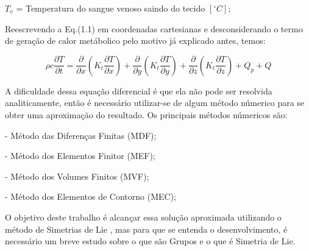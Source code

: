       $T_{v}$ = Temperatura do sangue venoso saindo do tecido $[^{\circ}C];$










  Reescrevendo a Eq.(1.1) em coordenadas cartesianas e desconsiderando o termo de geração de calor metábolico pelo motivo já explicado antes, temos:



  \begin{equation}\rho c\frac{\partial T}{\partial t} = \frac{\partial }{\partial x} \left (K_{t}\frac{\partial T}{\partial x}\right ) + \frac{\partial }{\partial y} \left(K_{t}\frac{\partial T}{\partial y}\right ) + \frac{\partial }{\partial z} \left (K_{t}\frac{\partial T}{\partial z}\right ) + Q_{p} + Q\end{equation}
  
   A dificuldade dessa equação diferencial é que ela não pode ser resolvida analiticamente, então é necessário utilizar-se de algum método númerico para se obter uma aproximação do resultado.
   Os principais métodos númericos são:
   
   - Método das Diferenças Finitas (MDF);
   
   - Método dos Elementos Finitor (MEF);
   
   - Método dos Volumes Finitos (MVF);
   
   - Método dos Elementos de Contorno (MEC);
   
   O objetivo deste trabalho é alcançar essa solução aproximada utilizando o método de Simetrias de Lie , mas para que se entenda o desenvolvimento, é necessário um breve estudo sobre o que são Grupos e o que é Simetria de Lie.
  
  







          
              